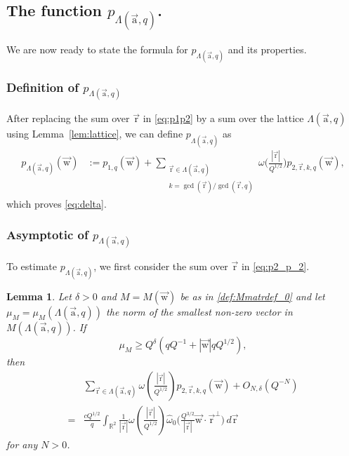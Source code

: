 \documentclass[letterpaper,11pt]{amsart}
\numberwithin{equation}{section}
\newtheorem{lemma}[theorem]{Lemma}
\theoremstyle{definition}
\numberwithin{equation}{section}
\renewcommand{\hat}{\widehat}
\newcommand{\ua}{\vec{\mathrm{a}}}
\newcommand{\ur}{\vec{\mathrm{r}}}
\newcommand{\uw}{{\vec{\mathrm{w}}}}
\renewcommand{\hat}{\widehat}
\newcommand{\R}{\mathbb{R}}
\begin{document}
\subsection{The function $p_{\Lambda(\ua,q)}$.}

 We are now ready to state the formula for $p_{\Lambda(\ua, q)}$ and its properties. 

\subsubsection{Definition of $p_{\Lambda(\ua,q)}$}
After replacing the sum over \(\ur\) in \eqref{eq:p1p2} by a sum over the lattice \(\Lambda(\ua,q)\) using Lemma~\ref{lem:lattice}, we can define $p_{\Lambda(\ua, q)}$ as 
	\begin{align}
		\label{eq:p2_p_2}
		p_{\Lambda(\ua,q)}(\uw)&:=p_{1,q}(\uw)+
		\sum_{\substack{\ur\in\Lambda(\ua,q)\\ k = \gcd(\ur)/\gcd(\ur,q)}}
		\omega\bigg(
		\frac{ |\ur| }{ Q^{1/2}}
		\bigg)
		p_{2,\ur,k,q}(\uw),
		\end{align}
		which proves \eqref{eq:delta}.

\subsubsection{Asymptotic of $p_{\Lambda(\ua,q)}$}
To estimate $p_{\Lambda(\ua, q)}$, we first consider the sum over $\ur$ in \eqref{eq:p2_p_2}.
\begin{lemma}\label{lem:p1_sum_asymptotic}
	Let $\delta>0$ and $M=M(\uw)$ be as in \eqref{def:Mmatrdef_0} and let $\mu_{M}=\mu_M(\Lambda(\ua, q))$ the norm of the smallest non-zero vector in $M (\Lambda (\ua, q))$. If
	\begin{equation}\label{eq:muM assump}
	\mu_M\geq
	Q^{\delta}(qQ^{-1}+|\uw|qQ^{1/2}),
	\end{equation}
	then
	\begin{equation*}%
    \begin{split}
	&\sum_{{\ur\in\Lambda(\ua,q)}}
	\omega\left(
	\frac{ |\ur| }{ Q^{1/2}}
	\right)
	p_{2,\ur,k,q}(\uw)+O_{N,\delta}(Q^{-N})
	\\=&
	\frac{cQ^{1/2}}{q}
	\int_{\R^2}\frac{1}{|\ur|}
	\omega\left(
	\frac{ |\ur| }{ Q^{1/2}}
	\right)
	\hat{\omega}_0
	\Big(
	\frac{Q^{3/2}}{|\ur|} \uw\cdot\ur^\perp
	\Big)\,d\ur
    \end{split}
	\end{equation*}
	for any $N>0$.
\end{lemma}
\end{document}
